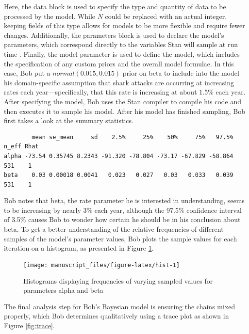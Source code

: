\documentclass[
  12pt,
]{book}
\theoremstyle{definition}
\theoremstyle{definition}
\theoremstyle{definition}
\theoremstyle{remark}
\begin{document}
Here, the data block is used to specify the type and quantity of data to be processed by the model. While \(N\) could be replaced with an actual integer, keeping fields of this type allows for models to be more flexible and require fewer changes. Additionally, the parameters block is used to declare the model's parameters, which correspond directly to the variables Stan will sample at run time \citep[  8.1]{StanManual2016}. Finally, the model parameter is used to define the model, which includes the specification of any custom priors and the overall model formulae. In this case, Bob put a \(normal(0.015,0.015)\) prior on beta to include into the model his domain-specific assumption that shark attacks are occurring at increasing rates each year---specifically, that this rate is increasing at about 1.5\% each year. After specifying the model, Bob uses the Stan compiler to compile his code and then executes it to sample his model. After his model has finished sampling, Bob first takes a look at the summary statistics.

\begin{verbatim}
        mean se_mean     sd    2.5%     25%    50%     75%   97.5% n_eff Rhat
alpha -73.54 0.35745 8.2343 -91.320 -78.804 -73.17 -67.829 -58.864   531    1
beta    0.03 0.00018 0.0041   0.023   0.027   0.03   0.033   0.039   531    1
\end{verbatim}

Bob notes that beta, the rate parameter he is interested in understanding, seems to be increasing by nearly 3\% each year, although the 97.5\% confidence interval of 3.5\% causes Bob to wonder how certain he should be in his conclusion about beta. To get a better understanding of the relative frequencies of different samples of the model's parameter values, Bob plots the sample values for each iteration on a histogram, as presented in Figure \ref{fig:hist}.

\begin{figure}

{\centering \texttt{[image: manuscript\_files/figure-latex/hist-1]} 

}

\caption{Histograms displaying frequencies of varying sampled values for parameters alpha and beta}\label{fig:hist}
\end{figure}

The final analysis step for Bob's Bayesian model is ensuring the chains mixed properly, which Bob determines qualitatively using a trace plot as shown in Figure \ref{fig:trace}.
\end{document}
